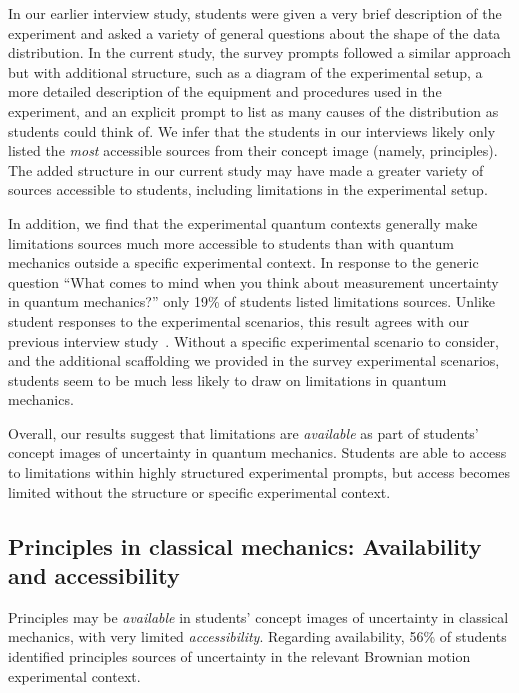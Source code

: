 \documentclass[english,aps,prstper,reprint,showpacs,longbibliography,superscriptaddress,nofootinbib]{revtex4-2}
\begin{document}
In our earlier interview study, students were given a very brief description of the experiment and asked a variety of general questions about the shape of the data distribution. In the current study, the survey prompts followed a similar approach but with additional structure, such as a diagram of the experimental setup, a more detailed description of the equipment and procedures used in the experiment, and an explicit prompt to list as many causes of the distribution as students could think of. We infer that the students in our interviews likely only listed the \emph{most} accessible sources from their concept image (namely, principles). The added structure in our current study may have made a greater variety of sources accessible to students, including limitations in the experimental setup.

In addition, we find that the experimental quantum contexts generally make limitations sources much more accessible to students than with quantum mechanics outside a specific experimental context. In response to the generic question ``What comes to mind when you think about measurement uncertainty in quantum mechanics?'' only 19\% of students listed limitations sources. Unlike student responses to the experimental scenarios, this result agrees with our previous interview study~\cite{Stein2019,Stump2020}.
Without a specific experimental scenario to consider, and the additional scaffolding we provided in the survey experimental scenarios, students seem to be much less likely to draw on limitations in quantum mechanics.

Overall, our results suggest that limitations are \emph{available} as part of students' concept images of uncertainty in quantum mechanics. Students are able to access to limitations within highly structured experimental prompts, but access becomes limited without the structure or specific experimental context.

\subsection{Principles in classical mechanics: Availability and accessibility}

Principles may be \emph{available} in students' concept images of uncertainty in classical mechanics, with very limited \emph{accessibility}. Regarding availability, 56\% of students identified principles sources of uncertainty in the relevant Brownian motion experimental context.
\end{document}
